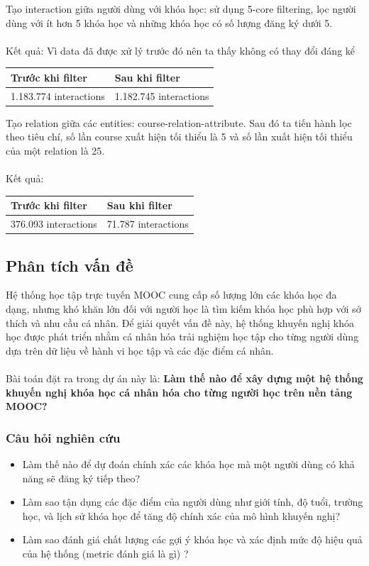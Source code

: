 Tạo interaction giữa người dùng với khóa học: sử dụng 5-core filtering, lọc người dùng với ít hơn 5 khóa học và những khóa học có số lượng đăng ký dưới 5.\\
\\
Kết quả: Vì data đã được xử lý trước đó nên ta thấy không có thay đổi đáng kể
\begin{center}
\begin{tabular}{|| m{15em}  m{15em}||} 
 \hline
 Trước khi filter & Sau khi filter\\ [0.5ex] 
 \hline\hline
 1.183.774 interactions & 1.182.745 interactions \\ [1ex]
 \hline
\end{tabular}
\end{center}
\newpage
Tạo relation giữa các entities: course-relation-attribute. Sau đó ta tiến hành lọc theo tiêu chí, số lần course xuất hiện tối thiểu là 5 và số lần xuất hiện tối thiểu của một relation là 25. \\
\\
Kết quả: 
\begin{center}
\begin{tabular}{|| m{15em}  m{15em}||} 
 \hline
 Trước khi filter & Sau khi filter\\ [0.5ex] 
 \hline\hline
 376.093 interactions & 71.787 interactions \\ [1ex]
 \hline
\end{tabular}
\end{center}
\subsection{Phân tích vấn đề}
Hệ thống học tập trực tuyến MOOC cung cấp số lượng lớn các khóa học đa dạng, nhưng khó khăn lớn đối với người học là tìm kiếm khóa học phù hợp với sở thích và nhu cầu cá nhân. Để giải quyết vấn đề này, hệ thống khuyến nghị khóa học được phát triển nhằm cá nhân hóa trải nghiệm học tập cho từng người dùng dựa trên dữ liệu về hành vi học tập và các đặc điểm cá nhân.\\
\\
Bài toán đặt ra trong dự án này là: \textbf{Làm thế nào để xây dựng một hệ thống khuyến nghị khóa học cá nhân hóa cho từng người học trên nền tảng MOOC?}
\subsubsection{Câu hỏi nghiên cứu}
\begin{itemize}
    \item Làm thế nào để dự đoán chính xác các khóa học mà một người dùng có khả năng sẽ đăng ký tiếp theo?
    \item Làm sao tận dụng các đặc điểm của người dùng như giới tính, độ tuổi, trường học, và lịch sử khóa học để tăng độ chính xác của mô hình khuyến nghị?
    \item Làm sao đánh giá chất lượng các gợi ý khóa học và xác định mức độ hiệu quả của hệ thống (metric đánh giá là gì) ?
\end{itemize}
